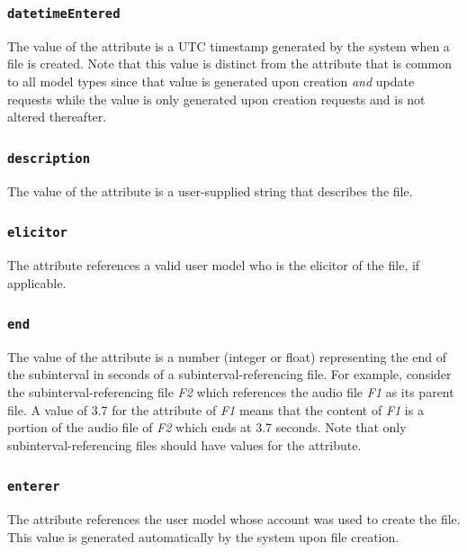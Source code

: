 \documentclass[letterpaper,10pt,english]{sphinxmanual}
\begin{document}
\subsubsection{\texttt{datetimeEntered}}
\label{datastructure:id10}
The value of the  attribute is a UTC timestamp generated by
the system when a file is created.  Note that this value is distinct from the
 attribute that is common to all model types since that
value is generated upon creation \emph{and} update requests while the
 value is only generated upon creation requests and is not
altered thereafter.


\subsubsection{\texttt{description}}
\label{datastructure:id11}
The value of the  attribute is a user-supplied string that
describes the file.


\subsubsection{\texttt{elicitor}}
\label{datastructure:id12}
The  attribute references a valid user model who is the elicitor of
the file, if applicable.


\subsubsection{\texttt{end}}
\label{datastructure:end}
The value of the  attribute is a number (integer or float) representing
the end of the subinterval in seconds of a subinterval-referencing file.  For
example, consider the subinterval-referencing file \emph{F2} which references the
audio file \emph{F1} as its parent file.  A value of 3.7 for the  attribute of
\emph{F1} means that the content of \emph{F1} is a portion of the audio file of \emph{F2} which
ends at 3.7 seconds.  Note that only subinterval-referencing files should have
values for the  attribute.


\subsubsection{\texttt{enterer}}
\label{datastructure:id13}
The  attribute references the user model whose account was used to
create the file.  This value is generated automatically by the system upon file
creation.
\end{document}
